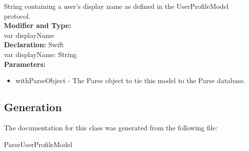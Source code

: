 String containing a user’s display name as defined in the UserProfileModel protocol.\\

\textbf{Modifier and Type:}\\
\tab var displayName\\


\textbf{Declaration:}
\tab 
Swift\\

var displayName: String\\

\textbf{Parameters:}
\begin{itemize}
\item withParseObject - The Parse object to tie this model to the Parse database.
\end{itemize}


\subsection{Generation}
The documentation for this class was generated from the following file\-:
\begin{DoxyCompactItemize}
\item ParseUserProfileModel
\end{DoxyCompactItemize} 









